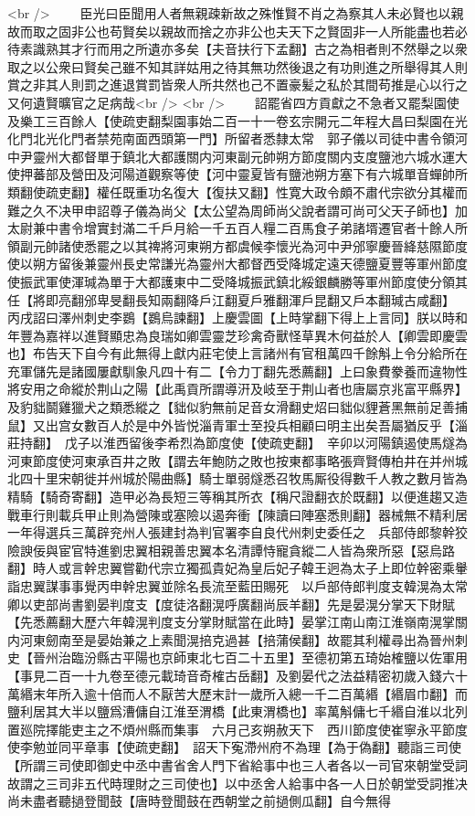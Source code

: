 <br />
　　臣光曰臣聞用人者無親疎新故之殊惟賢不肖之為察其人未必賢也以親故而取之固非公也苟賢矣以親故而捨之亦非公也夫天下之賢固非一人所能盡也若必待素識熟其才行而用之所遺亦多矣【夫音扶行下孟翻】古之為相者則不然舉之以衆取之以公衆曰賢矣己雖不知其詳姑用之待其無功然後退之有功則進之所舉得其人則賞之非其人則罰之進退賞罰皆衆人所共然也己不置豪髪之私於其間苟推是心以行之又何遺賢曠官之足病哉<br />
<br />
　　詔罷省四方貢獻之不急者又罷梨園使及樂工三百餘人【使疏吏翻梨園事始二百一十一卷玄宗開元二年程大昌曰梨園在光化門北光化門者禁苑南面西頭第一門】所留者悉隸太常　郭子儀以司徒中書令領河中尹靈州大都督單于鎮北大都護關内河東副元帥朔方節度關内支度鹽池六城水運大使押蕃部及營田及河陽道觀察等使【河中靈夏皆有鹽池朔方塞下有六城單音蟬帥所類翻使疏吏翻】權任既重功名復大【復扶又翻】性寛大政令頗不肅代宗欲分其權而難之久不决甲申詔尊子儀為尚父【太公望為周師尚父說者謂可尚可父天子師也】加太尉兼中書令增實封滿二千戶月給一千五百人糧二百馬食子弟諸壻遷官者十餘人所領副元帥諸使悉罷之以其禆將河東朔方都虞候李懷光為河中尹邠寧慶晉絳慈隰節度使以朔方留後兼靈州長史常謙光為靈州大都督西受降城定遠天德鹽夏豐等軍州節度使振武軍使渾瑊為單于大都護東中二受降城振武鎮北綏銀麟勝等軍州節度使分領其任【將即亮翻邠卑旻翻長知兩翻降戶江翻夏戶雅翻渾戶昆翻又戶本翻瑊古咸翻】　丙戌詔曰澤州刺史李鷃【鷃烏諫翻】上慶雲圖【上時掌翻下得上上言同】朕以時和年豐為嘉祥以進賢顯忠為良瑞如卿雲靈芝珍禽奇獸怪草異木何益於人【卿雲即慶雲也】布告天下自今有此無得上獻内莊宅使上言諸州有官租萬四千餘斛上令分給所在充軍儲先是諸國屢獻馴象凡四十有二【令力丁翻先悉薦翻】上曰象費豢養而違物性將安用之命縱於荆山之陽【此禹貢所謂導汧及岐至于荆山者也唐屬京兆富平縣界】及豹貀鬬雞獵犬之類悉縱之【貀似豹無前足音女滑翻史炤曰貀似貍蒼黑無前足善捕鼠】又出宫女數百人於是中外皆悦淄青軍士至投兵相顧曰明主出矣吾屬猶反乎【淄莊持翻】　戊子以淮西留後李希烈為節度使【使疏吏翻】　辛卯以河陽鎮遏使馬燧為河東節度使河東承百井之敗【謂去年鮑防之敗也按東都事略張齊賢傳柏井在并州城北四十里宋朝徙并州城於陽曲縣】騎士單弱燧悉召牧馬厮役得數千人教之數月皆為精騎【騎奇寄翻】造甲必為長短三等稱其所衣【稱尺證翻衣於既翻】以便進趨又造戰車行則載兵甲止則為營陳或塞險以遏奔衝【陳讀曰陣塞悉則翻】器械無不精利居一年得選兵三萬辟兖州人張建封為判官署李自良代州刺史委任之　兵部侍郎黎幹狡險諛佞與宦官特進劉忠翼相親善忠翼本名清譚恃寵貪縱二人皆為衆所惡【惡烏路翻】時人或言幹忠翼嘗勸代宗立獨孤貴妃為皇后妃子韓王迥為太子上即位幹密乘轝詣忠翼謀事事覺丙申幹忠翼並除名長流至藍田賜死　以戶部侍郎判度支韓滉為太常卿以吏部尚書劉晏判度支【度徒洛翻滉呼廣翻尚辰羊翻】先是晏滉分掌天下財賦【先悉薦翻大歷六年韓滉判度支分掌財賦當在此時】晏掌江南山南江淮嶺南滉掌關内河東劒南至是晏始兼之上素聞滉掊克過甚【掊蒲侯翻】故罷其利權尋出為晉州刺史【晉州治臨汾縣古平陽也京師東北七百二十五里】至德初第五琦始榷鹽以佐軍用【事見二百一十九卷至德元載琦音奇榷古岳翻】及劉晏代之法益精密初歲入錢六十萬緡末年所入逾十倍而人不厭苦大歷末計一歲所入總一千二百萬緡【緡眉巾翻】而鹽利居其大半以鹽爲漕傭自江淮至渭橋【此東渭橋也】率萬斛傭七千緡自淮以北列置廵院擇能吏主之不煩州縣而集事　六月己亥朔赦天下　西川節度使崔寧永平節度使李勉並同平章事【使疏吏翻】　詔天下寃滯州府不為理【為于偽翻】聽詣三司使【所謂三司使即御史中丞中書省舍人門下省給事中也三人者各以一司官來朝堂受詞故謂之三司非五代時理財之三司使也】以中丞舍人給事中各一人日於朝堂受詞推决尚未盡者聽撾登聞鼓【唐時登聞鼓在西朝堂之前撾側瓜翻】自今無得
